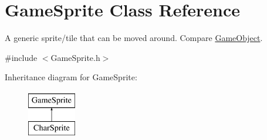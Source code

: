 \hypertarget{class_game_sprite}{}\section{Game\+Sprite Class Reference}
\label{class_game_sprite}


A generic sprite/tile that can be moved around. Compare \mbox{\hyperlink{class_game_object}{Game\+Object}}.  




{\ttfamily \#include $<$Game\+Sprite.\+h$>$}

Inheritance diagram for Game\+Sprite\+:\begin{figure}[H]
\begin{center}
\leavevmode
\includegraphics[height=2.000000cm]{class_game_sprite}
\end{center}
\end{figure}
